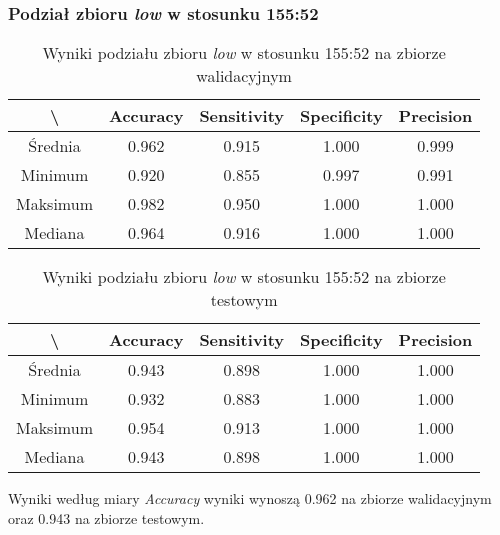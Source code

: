\subsubsection{Podział zbioru \textit{low} w stosunku 155:52}


\begin{table}[H]
	\centering
	\caption{Wyniki podziału zbioru \textit{low} w stosunku 155:52 na zbiorze walidacyjnym}
	\vspace{6pt}
	{\footnotesize
		\begin{tabular}{|c|c|c|c|c|}
      \hline \textbackslash & Accuracy & Sensitivity & Specificity & Precision \\
      \hline Średnia & 0.962 & 0.915 & 1.000 & 0.999 \\
      \hline Minimum & 0.920 & 0.855 & 0.997 & 0.991 \\
      \hline Maksimum & 0.982 & 0.950 & 1.000 & 1.000 \\
      \hline Mediana & 0.964 & 0.916 & 1.000 & 1.000 \\
      \hline
    \end{tabular}
    \label{Tab:lowsplitc_val}
	}
	\vspace{0pt}
\end{table}

\begin{table}[H]
	\centering
	\caption{Wyniki podziału zbioru \textit{low} w stosunku 155:52 na zbiorze testowym}
	\vspace{6pt}
	{\footnotesize
		\begin{tabular}{|c|c|c|c|c|}
      \hline \textbackslash & Accuracy & Sensitivity & Specificity & Precision \\
      \hline Średnia & 0.943 & 0.898 & 1.000 & 1.000 \\
      \hline Minimum & 0.932 & 0.883 & 1.000 & 1.000 \\
      \hline Maksimum & 0.954 & 0.913 & 1.000 & 1.000 \\
      \hline Mediana & 0.943 & 0.898 & 1.000 & 1.000 \\
      \hline
    \end{tabular}
    \label{Tab:lowsplitc_test}
	}
	\vspace{0pt}
\end{table}

Wyniki według miary \textit{Accuracy} wyniki wynoszą 0.962 na zbiorze walidacyjnym oraz 0.943 na zbiorze testowym.
